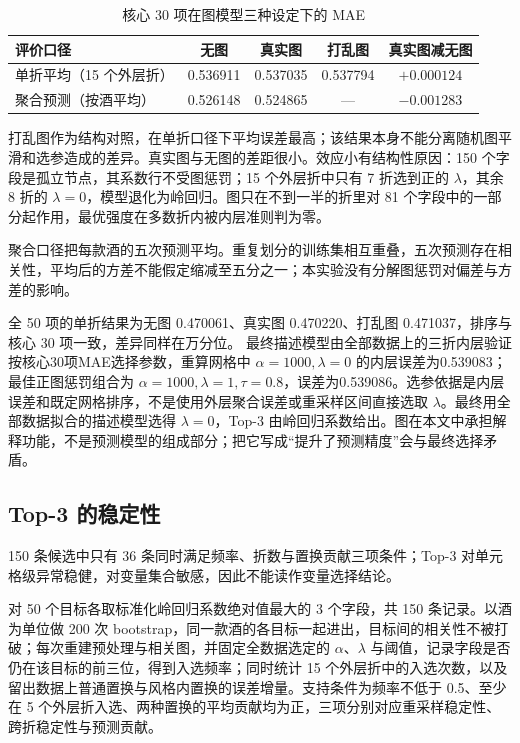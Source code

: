 \begin{table}[t]
\centering\small\renewcommand{\arraystretch}{1.2}
\caption{核心 30 项在图模型三种设定下的 MAE}
\label{tab:graph}
\begin{tabular}{@{}lcccc@{}}
\toprule
评价口径 & 无图 & 真实图 & 打乱图 & 真实图减无图 \\
\midrule
单折平均（15 个外层折） & 0.536911 & 0.537035 & 0.537794 & $+0.000124$ \\
聚合预测（按酒平均） & 0.526148 & 0.524865 & — & $-0.001283$ \\
\bottomrule
\end{tabular}
\end{table}

打乱图作为结构对照，在单折口径下平均误差最高；该结果本身不能分离随机图平滑和选参造成的差异。真实图与无图的差距很小。效应小有结构性原因：150 个字段是孤立节点，其系数行不受图惩罚；15 个外层折中只有 7 折选到正的 $\lambda$，其余 8 折的 $\lambda=0$，模型退化为岭回归。图只在不到一半的折里对 81 个字段中的一部分起作用，最优强度在多数折内被内层准则判为零。

聚合口径把每款酒的五次预测平均。重复划分的训练集相互重叠，五次预测存在相关性，平均后的方差不能假定缩减至五分之一；本实验没有分解图惩罚对偏差与方差的影响。

全 50 项的单折结果为无图 0.470061、真实图 0.470220、打乱图 0.471037，排序与核心 30 项一致，差异同样在万分位。 最终描述模型由全部数据上的三折内层验证按核心30项MAE选择参数，重算网格中 $\alpha=1000,\lambda=0$ 的内层误差为0.539083；最佳正图惩罚组合为 $\alpha=1000,\lambda=1,\tau=0.8$，误差为0.539086。选参依据是内层误差和既定网格排序，不是使用外层聚合误差或重采样区间直接选取 $\lambda$。最终用全部数据拟合的描述模型选得 $\lambda=0$，Top-3 由岭回归系数给出。图在本文中承担解释功能，不是预测模型的组成部分；把它写成“提升了预测精度”会与最终选择矛盾。

\subsection{Top-3 的稳定性}

150 条候选中只有 36 条同时满足频率、折数与置换贡献三项条件；Top-3 对单元格级异常稳健，对变量集合敏感，因此不能读作变量选择结论。

对 50 个目标各取标准化岭回归系数绝对值最大的 3 个字段，共 150 条记录。以酒为单位做 200 次 bootstrap，同一款酒的各目标一起进出，目标间的相关性不被打破；每次重建预处理与相关图，并固定全数据选定的 $\alpha$、$\lambda$ 与阈值，记录字段是否仍在该目标的前三位，得到入选频率\cite{efron1993}；同时统计 15 个外层折中的入选次数，以及留出数据上普通置换与风格内置换的误差增量。支持条件为频率不低于 0.5、至少在 5 个外层折入选、两种置换的平均贡献均为正，三项分别对应重采样稳定性、跨折稳定性与预测贡献。

